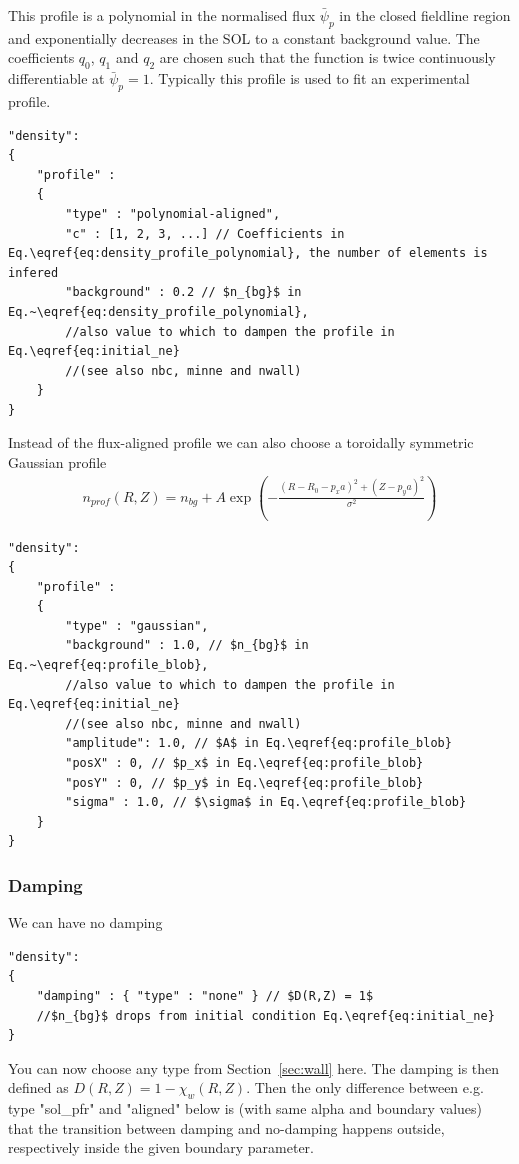 This profile is a polynomial in the normalised flux $\bar \psi_p$ in the closed fieldline region and exponentially
decreases in the SOL to a constant background value.
The coefficients $q_0$, $q_1$ and $q_2$ are chosen such that the function is twice continuously differentiable at $\bar \psi_p =1$.
Typically this profile is used to fit an experimental profile.
\begin{verbatim}
"density":
{
    "profile" :
    {
        "type" : "polynomial-aligned",
        "c" : [1, 2, 3, ...] // Coefficients in Eq.\eqref{eq:density_profile_polynomial}, the number of elements is infered
        "background" : 0.2 // $n_{bg}$ in Eq.~\eqref{eq:density_profile_polynomial},
        //also value to which to dampen the profile in Eq.\eqref{eq:initial_ne}
        //(see also nbc, minne and nwall)
    }
}
\end{verbatim}
\noindent
Instead of the flux-aligned profile we can also choose a toroidally symmetric Gaussian profile
\begin{align} \label{eq:profile_blob}
    n_{prof}(R,Z) = n_{bg} + A \exp\left( -\frac{(R - R_0 - p_x a)^2 + (Z-p_ya)^2}{\sigma^2} \right)
\end{align}
\begin{verbatim}
"density":
{
    "profile" :
    {
        "type" : "gaussian",
        "background" : 1.0, // $n_{bg}$ in Eq.~\eqref{eq:profile_blob},
        //also value to which to dampen the profile in Eq.\eqref{eq:initial_ne}
        //(see also nbc, minne and nwall)
        "amplitude": 1.0, // $A$ in Eq.\eqref{eq:profile_blob}
        "posX" : 0, // $p_x$ in Eq.\eqref{eq:profile_blob}
        "posY" : 0, // $p_y$ in Eq.\eqref{eq:profile_blob}
        "sigma" : 1.0, // $\sigma$ in Eq.\eqref{eq:profile_blob}
    }
}
\end{verbatim}
\subsubsection{Damping} \label{sec:damping}
We can have no damping
\begin{verbatim}
"density":
{
    "damping" : { "type" : "none" } // $D(R,Z) = 1$
    //$n_{bg}$ drops from initial condition Eq.\eqref{eq:initial_ne}
}
\end{verbatim}
\begin{tcolorbox}[title=Recent Update]
You can now choose any type from Section~\ref{sec:wall} here.
The damping is then defined as $D(R,Z) = 1- \chi_w(R,Z)$.
Then the only difference between e.g. type "sol\_pfr" and "aligned" below is
(with same alpha and boundary values) that the
transition between damping and no-damping happens outside, respectively
inside the given boundary parameter.
\end{tcolorbox}

